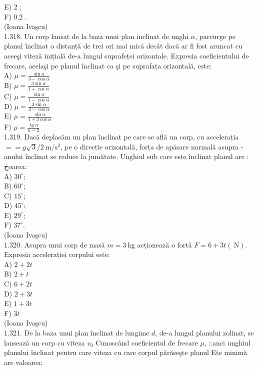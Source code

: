 {E) 2 ;\\
F) 0,2 .\\
(Ioana Ivaşcu)\\
1.318. Un corp lansat de la baza unui plan inclinat de unghi $\alpha$, parcurge pe planul înclinat o distanță de trei ori mai mică decât dacă ar fi fost aruncat cu aceeşi viteză inițială de-a lungul suprafeței orizontale. Expresia coeficientului de frecare, acelaşi pe planul înclinat ca şi pe suprafața orizontală, este:\\
A) $\mu=\frac{\sin \alpha}{3-\cos \alpha}$\\
B) $\mu=\frac{3 \sin \alpha}{1+\cos \alpha}$\\
C) $\mu=\frac{\sin \alpha}{1-\cos \alpha}$\\
D) $\mu=\frac{3 \sin \alpha}{3-\cos \alpha}$\\
E) $\mu=\frac{\sin \alpha}{1+3 \cos \alpha}$\\
F) $\mu=\frac{\operatorname{tg} \alpha}{n-2}$\\
1.319. Dacă deplasăm un plan înclinat pe care se află un corp, cu accelerația $==g \sqrt{3} / 2 \mathrm{~m} / \mathrm{s}^{2}$, pe o directie orizontală, forța de apăsare normală asupra - anului înclinat se reduce la jumătate. Unghiul sub care este înclinat planul are : خoarea:\\
A) $30^{\circ}$;\\
B) $60^{\circ}$;\\
C) $15^{\circ}$;\\
D) $45^{\circ}$;\\
E) $29^{\circ}$;\\
F) $37^{\circ}$.\\
(Ioana Ivaşcu)\\
1.320. Asupra unui corp de masă $m=3 \mathrm{~kg}$ acționează o fortă $F=6+3 t(\mathrm{~N})$. Expresia accelerației corpului este:\\
A) $2+2 t$\\
B) $2+t$\\
C) $6+2 t$\\
D) $2+3 t$\\
E) $1+3 t$\\
F) $3 t$\\
(Ioana Ivaşcu)\\
1.321. De la baza unui plan înclinat de lungime $d$, de-a lungul planului zolinat, se lansează un corp cu viteza $v_{0}$ Cunoscând coeficientul de frecare $\mu$, ::anci unghiul planului înclinat pentru care viteza cu care corpul părăseşte planul Ete minimă are valoarea:\\
}
